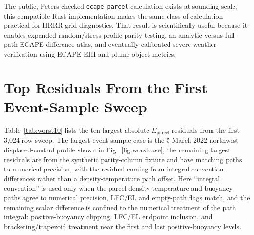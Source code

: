 \documentclass[11pt]{article}
\begin{document}
The public, Peters-checked \texttt{ecape-parcel} calculation exists at sounding scale; this compatible Rust implementation makes the same class of calculation practical for HRRR-grid diagnostics. That result is scientifically useful because it enables expanded random/stress-profile parity testing, an analytic-versus-full-path ECAPE difference atlas, and eventually calibrated severe-weather verification using ECAPE-EHI and plume-object metrics.

\appendix
\section{Top Residuals From the First Event-Sample Sweep}

Table~\ref{tab:worst10} lists the ten largest absolute $E_{\mathrm{parcel}}$ residuals from the first 3,024-row sweep. The largest event-sample case is the 5 March 2022 northwest displaced-control profile shown in Fig.~\ref{fig:worstcase}; the remaining largest residuals are from the synthetic parity-column fixture and have matching paths to numerical precision, with the residual coming from integral convention differences rather than a density-temperature path offset. Here ``integral convention'' is used only when the parcel density-temperature and buoyancy paths agree to numerical precision, LFC/EL and empty-path flags match, and the remaining scalar difference is confined to the numerical treatment of the path integral: positive-buoyancy clipping, LFC/EL endpoint inclusion, and bracketing/trapezoid treatment near the first and last positive-buoyancy levels.
\end{document}
